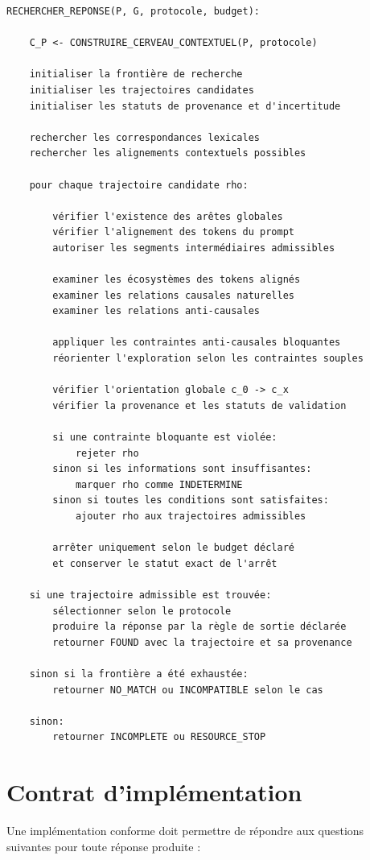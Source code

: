 \documentclass[11pt,a4paper,oneside]{book}
\theoremstyle{remark}
\begin{document}
\begin{verbatim}
RECHERCHER_REPONSE(P, G, protocole, budget):

    C_P <- CONSTRUIRE_CERVEAU_CONTEXTUEL(P, protocole)

    initialiser la frontière de recherche
    initialiser les trajectoires candidates
    initialiser les statuts de provenance et d'incertitude

    rechercher les correspondances lexicales
    rechercher les alignements contextuels possibles

    pour chaque trajectoire candidate rho:

        vérifier l'existence des arêtes globales
        vérifier l'alignement des tokens du prompt
        autoriser les segments intermédiaires admissibles

        examiner les écosystèmes des tokens alignés
        examiner les relations causales naturelles
        examiner les relations anti-causales

        appliquer les contraintes anti-causales bloquantes
        réorienter l'exploration selon les contraintes souples

        vérifier l'orientation globale c_0 -> c_x
        vérifier la provenance et les statuts de validation

        si une contrainte bloquante est violée:
            rejeter rho
        sinon si les informations sont insuffisantes:
            marquer rho comme INDETERMINE
        sinon si toutes les conditions sont satisfaites:
            ajouter rho aux trajectoires admissibles

        arrêter uniquement selon le budget déclaré
        et conserver le statut exact de l'arrêt

    si une trajectoire admissible est trouvée:
        sélectionner selon le protocole
        produire la réponse par la règle de sortie déclarée
        retourner FOUND avec la trajectoire et sa provenance

    sinon si la frontière a été exhaustée:
        retourner NO_MATCH ou INCOMPATIBLE selon le cas

    sinon:
        retourner INCOMPLETE ou RESOURCE_STOP
\end{verbatim}

\section{Contrat d'implémentation}

Une implémentation conforme doit permettre de répondre aux questions
suivantes pour toute réponse produite :
\end{document}
